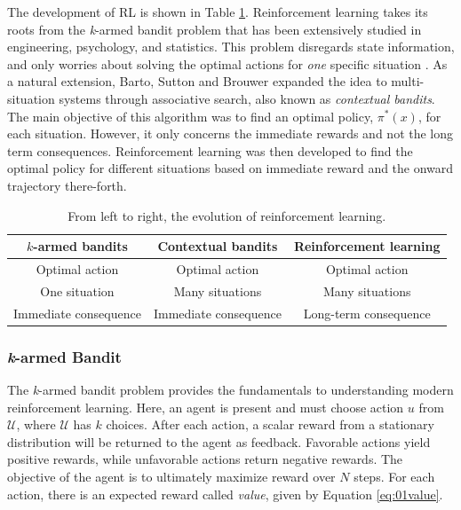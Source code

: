 The development of RL is shown in Table \ref{tab:RLevo}.  Reinforcement learning takes its roots from the \textit{k}-armed bandit problem that has been extensively studied in engineering, psychology, and statistics.  This problem disregards state information, and only worries about solving the optimal actions for \textit{one} specific situation \cite{thompson1, thompson2, robbins, bellman_bandit}.  As a natural extension, Barto, Sutton and Brouwer expanded the idea to multi-situation systems \cite{bartosuttonbrouwer} through associative search, also known as \textit{contextual bandits}. The main objective of this algorithm was to find an optimal policy, $\pi^*(x)$, for each situation.  However, it only concerns the immediate rewards and not the long term consequences. Reinforcement learning was then developed to find the optimal policy for different situations based on immediate reward and the onward trajectory there-forth.  

\begin{table}[H]
\caption{From left to right, the evolution of reinforcement learning.}
\centering
\begin{tabular}{c|c|c}
\textbf{$k$-armed bandits}	& \textbf{Contextual bandits}	& \textbf{Reinforcement learning}\\
\hline
Optimal action		  & Optimal action			& Optimal action \\
One situation		  & Many situations			& Many situations \\
Immediate consequence & Immediate consequence	& Long-term consequence \\
\end{tabular}
\label{tab:RLevo}
\end{table}

\subsubsection{\textit{k}-armed Bandit}

The \textit{k}-armed bandit problem provides the fundamentals to understanding modern reinforcement learning.  Here, an agent is present and must choose action $u$ from $\mathcal{U}$, where $\mathcal{U}$ has $k$ choices.  After each action, a scalar reward from a stationary distribution will be returned to the agent as feedback. Favorable actions yield positive rewards, while unfavorable actions return negative rewards. The objective of the agent is to ultimately maximize reward over $N$ steps.  For each action, there is an expected reward called \textit{value}, given by Equation \ref{eq:01value}.

